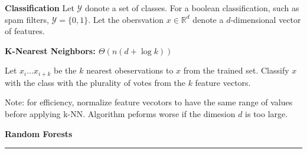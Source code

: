 \documentclass[landscape]{article}
\begin{document}
\begin{multicols}{3}
\textbf{Classification}
Let $\mathcal{Y}$ donote a set of classes. For a boolean classification, such as spam filters, $\mathcal{Y} = \{0, 1\}$. Let the obersvation $x \in \mathbb{R}^d$ denote a $d$-dimensional vector of features.

\textbf{K-Nearest Neighbors: $\Theta(n(d + \log k))$}

Let $x_i \ldots x_{i+k}$ be the $k$ nearest obeservations to $x$ from the trained set. Classify $x$ with the class with the plurality of votes from the $k$ feature vectors.

Note: for efficiency, normalize feature vecotors to have the same range of values before applying k-NN. Algorithm peforms worse if the dimesion $d$ is too large.

\textbf{Random Forests}


\rule{0.3\linewidth}{0.25pt}
\newpage
\scriptsize


\end{multicols}
\end{document}
